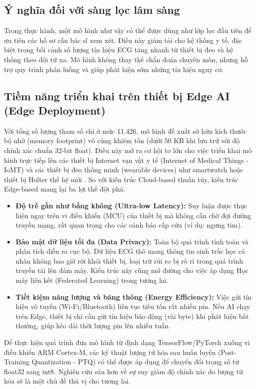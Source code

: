 \documentclass[conference]{IEEEtran}
\begin{document}
\subsection{Ý nghĩa đối với sàng lọc lâm sàng}
Trong thực hành, một mô hình như vậy có thể được dùng như lớp lọc đầu tiên để ưu tiên các hồ sơ cần bác sĩ xem xét. Điều này giảm tải cho hệ thống y tế, đặc biệt trong bối cảnh số lượng tín hiệu ECG tăng nhanh từ thiết bị đeo và hệ thống theo dõi từ xa. Mô hình không thay thế chẩn đoán chuyên môn, nhưng hỗ trợ quy trình phân luồng và giúp phát hiện sớm những tín hiệu nguy cơ.

\subsection{Tiềm năng triển khai trên thiết bị Edge AI (Edge Deployment)}
Với tổng số lượng tham số chỉ ở mức 11.426, mô hình đề xuất sở hữu kích thước bộ nhớ (memory footprint) vô cùng khiêm tốn (dưới 50 KB khi lưu trữ với độ chính xác chuẩn 32-bit float). Điều này mở ra cơ hội to lớn cho việc triển khai mô hình trực tiếp lên các thiết bị Internet vạn vật y tế (Internet of Medical Things - IoMT) và các thiết bị đeo thông minh (wearable devices) như smartwatch hoặc thiết bị Holter thế hệ mới \cite{edge_ai_healthcare}. 
So với kiến trúc Cloud-based thuần túy, kiến trúc Edge-based mang lại ba lợi thế đột phá:
\begin{itemize}
    \item \textbf{Độ trễ gần như bằng không (Ultra-low Latency):} Suy luận được thực hiện ngay trên vi điều khiển (MCU) của thiết bị mà không cần chờ đợi đường truyền mạng, rất quan trọng cho các cảnh báo cấp cứu (ví dụ: ngưng tim).
    \item \textbf{Bảo mật dữ liệu tối đa (Data Privacy):} Toàn bộ quá trình tính toán và phân tích diễn ra cục bộ. Dữ liệu ECG thô mang thông tin sinh trắc học cá nhân không bao giờ rời khỏi thiết bị, loại trừ rủi ro bị rò rỉ trong quá trình truyền tải lên đám mây. Kiến trúc này cũng mở đường cho việc áp dụng Học máy liên kết (Federated Learning) \cite{federated_learning_ecg} trong tương lai.
    \item \textbf{Tiết kiệm năng lượng và băng thông (Energy Efficiency):} Việc gửi tín hiệu vô tuyến (Wi-Fi/Bluetooth) liên tục tiêu tốn rất nhiều pin. Nếu AI chạy trên Edge, thiết bị chỉ cần gửi tín hiệu báo động (vài byte) khi phát hiện bất thường, giúp kéo dài thời lượng pin lên nhiều tuần.
\end{itemize}
Để thực hiện quá trình đưa mô hình từ định dạng TensorFlow/PyTorch xuống vi điều khiển ARM Cortex-M, các kỹ thuật lượng tử hóa sau huấn luyện (Post-Training Quantization - PTQ) có thể được áp dụng để chuyển đổi trọng số từ float32 sang int8. Nghiên cứu sâu hơn về sự suy giảm độ chính xác do lượng tử hóa sẽ là một chủ đề thú vị cho tương lai.
\end{document}

